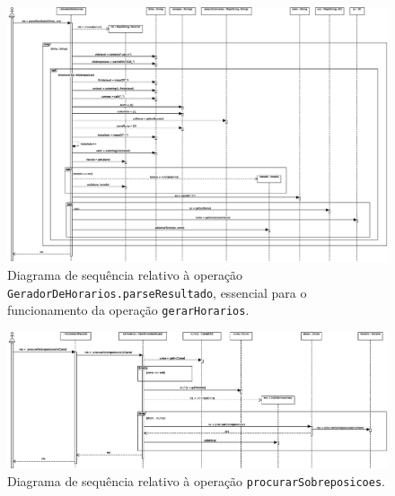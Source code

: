 \documentclass[12pt, a4paper]{article}
\begin{document}
\begingroup
    \begin{landscape}
        \thispagestyle{empty}
        \vspace*{\fill}

        \begin{figure}[H]
            \centering
            \includegraphics[scale=0.50]{Imagens/Modelos/gerarHorariosParseResultadoDAO.svg.eps}
            \caption{
                Diagrama de sequência relativo à operação \texttt{GeradorDeHorarios.parseResultado},
                essencial para o funcionamento da operação \texttt{gerarHorarios}.
            }
        \end{figure}

        \vspace*{\fill}
        \pagebreak
        \vspace*{\fill}

        \begin{figure}[H]
            \centering
            \includegraphics[scale=0.60]{Imagens/Modelos/procurarSobreposicoesDAO.svg.eps}
            \caption{
                Diagrama de sequência relativo à operação \texttt{procurarSobreposicoes}.
            }
        \end{figure}


\end{landscape}
\end{document}
